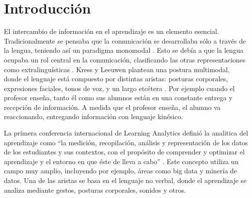 \chapter{Introducci\'on}

El intercambio de informaci\'on en el aprendizaje es un elemento esencial. Tradicionalmente se pensaba que la comunicaci\'on se desarrollaba s\'olo a trav\'es de la lengua, teniendo as\'i un paradigma monomodal \cite{ref1}. Esto se deb\'ia a que la lengua ocupaba un rol central en la comunicaci\'on, clasificando las otras representaciones como extralingu\'isticas \cite{ref1}. Kress y Leeuwen plantean una postura multimodal, donde el lenguaje est\'a compuesto por distintas aristas: posturas corporales, expresiones faciales, tonos de voz, y un largo etc\'etera \cite{ref13}.
Por ejemplo cuando el profesor ense\~na, tanto \'el como sus alumnos est\'an en una constante entrega y recepci\'on de informaci\'on. A medida que el profesor ense\~na, el alumno va reaccionando, entregando informaci\'on con lenguaje kin\'esico. 

La primera conferencia internacional de Learning Analytics defini\'o la analitica del aprendizaje como ``la medici\'on, recopilaci\'on, an\'alisis y representaci\'on de los datos de los estudiantes y sus contextos, con el prop\'osito de comprender y optimizar el aprendizaje y el entorno en que \'este de lleva a cabo'' \cite{ref5}. Este concepto utiliza un campo muy amplio, incluyendo por ejemplo, \'areas como big data y miner\'ia de datos. Una de las aristas se basa en el lenguaje no verbal, donde el aprendizaje se analiza mediante gestos, posturas corporales, sonidos y otros.

